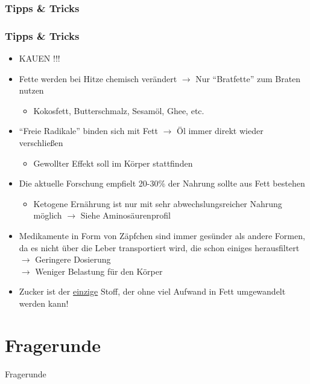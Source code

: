 \documentclass[xcolor=dvipsnames]{beamer}
\begin{document}
    \subsubsection{Tipps \& Tricks}
    \begin{frame}[allowframebreaks]
        \frametitle{Tipps \& Tricks}

        \begin{itemize}
            \item KAUEN !!!
        \end{itemize}

        \framebreak

        \begin{itemize}
            \setlength\itemsep{1em}
            \item Fette werden bei Hitze chemisch verändert $\rightarrow$ Nur "`Bratfette"' zum Braten nutzen
            \begin{itemize}
                \item Kokosfett, Butterschmalz, Sesamöl, Ghee, etc.
            \end{itemize}
            \item "`Freie Radikale"' binden sich mit Fett $\rightarrow$ Öl immer direkt wieder verschließen
            \begin{itemize}
                \item Gewollter Effekt soll im Körper stattfinden
            \end{itemize}
            \item Die aktuelle Forschung empfielt 20-30\% der Nahrung sollte aus Fett bestehen
            \begin{itemize}
                \item Ketogene Ernährung ist nur mit sehr abwechslungsreicher Nahrung möglich $\rightarrow$ Siehe Aminosäurenprofil
            \end{itemize}
        \end{itemize}

        \framebreak

        \begin{itemize}
            \setlength\itemsep{1em}
            \item Medikamente in Form von Zäpfchen sind immer gesünder als andere Formen, da es nicht über die Leber transportiert wird, die schon einiges herausfiltert\\
            $\rightarrow$ Geringere Dosierung\\
            $\rightarrow$ Weniger Belastung für den Körper
            \item Zucker ist der \underline{einzige} Stoff, der ohne viel Aufwand in Fett umgewandelt werden kann!
        \end{itemize}
    \end{frame}

    \section{Fragerunde}
    {
        \begin{frame}
            \begin{center}
                \Huge Fragerunde
            \end{center}
        \end{frame}
    }
\end{document}
